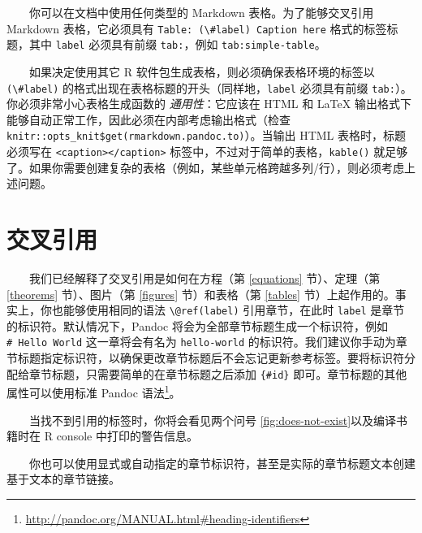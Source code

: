\documentclass[
  12pt,
]{krantz}
\renewcommand{\href}[2]{#2\footnote{\url{#1}}}
\theoremstyle{definition}
\theoremstyle{definition}
\theoremstyle{definition}
\theoremstyle{definition}
\theoremstyle{remark}
\begin{document}
  你可以在文档中使用任何类型的 Markdown 表格。为了能够交叉引用 Markdown 表格，它必须具有 \texttt{Table:\ (\textbackslash{}\#label)\ Caption\ here} 格式的标签标题，其中 \texttt{label} 必须具有前缀 \texttt{tab:}，例如 \texttt{tab:simple-table}。

  如果决定使用其它 R 软件包生成表格，则必须确保表格环境的标签以 \texttt{(\textbackslash{}\#label)} 的格式出现在表格标题的开头（同样地，\texttt{label} 必须具有前缀 \texttt{tab:}）。你必须非常小心表格生成函数的 \emph{通用性}：它应该在 HTML 和 LaTeX 输出格式下能够自动正常工作，因此必须在内部考虑输出格式（检查 \texttt{knitr::opts\_knit\$get(\textquotesingle{}rmarkdown.pandoc.to\textquotesingle{})}）。当输出 HTML 表格时，标题必须写在 \texttt{\textless{}caption\textgreater{}\textless{}/caption\textgreater{}} 标签中，不过对于简单的表格，\texttt{kable()} 就足够了。如果你需要创建复杂的表格（例如，某些单元格跨越多列/行），则必须考虑上述问题。

\hypertarget{cross-references}{%
\section{交叉引用}\label{cross-references}}

  我们已经解释了交叉引用是如何在方程（第 \ref{equations} 节）、定理（第 \ref{theorems} 节）、图片（第 \ref{figures} 节）和表格（第 \ref{tables} 节）上起作用的。事实上，你也能够使用相同的语法 \texttt{\textbackslash{}@ref(label)} 引用章节，在此时 \texttt{label} 是章节的标识符。默认情况下，Pandoc 将会为全部章节标题生成一个标识符，例如 \texttt{\#\ Hello\ World} 这一章将会有名为 \texttt{hello-world} 的标识符。我们建议你手动为章节标题指定标识符，以确保更改章节标题后不会忘记更新参考标签。要将标识符分配给章节标题，只需要简单的在章节标题之后添加 \texttt{\{\#id\}} 即可。章节标题的其他属性可以使用标准 \href{http://pandoc.org/MANUAL.html\#heading-identifiers}{Pandoc 语法}。

  当找不到引用的标签时，你将会看见两个问号 \ref{fig:does-not-exist}以及编译书籍时在 R console 中打印的警告信息。

  你也可以使用显式或自动指定的章节标识符，甚至是实际的章节标题文本创建基于文本的章节链接。
\end{document}
